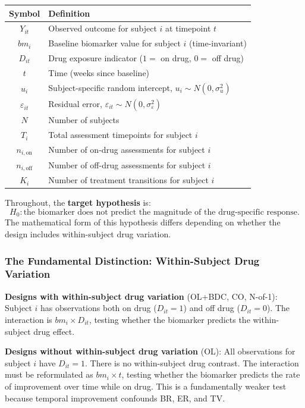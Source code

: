 \documentclass[11pt]{article}
\begin{document}
\begin{table}[h]
\centering\small
\begin{tabular}{@{}cl@{}}
\toprule
Symbol & Definition \\
\midrule
$Y_{it}$ & Observed outcome for subject $i$ at timepoint $t$ \\
$bm_i$ & Baseline biomarker value for subject $i$ (time-invariant) \\
$D_{it}$ & Drug exposure indicator ($1 = $ on drug, $0 = $ off drug) \\
$t$ & Time (weeks since baseline) \\
$u_i$ & Subject-specific random intercept, $u_i \sim N(0, \sigma^2_u)$ \\
$\varepsilon_{it}$ & Residual error, $\varepsilon_{it} \sim N(0, \sigma^2_\varepsilon)$ \\
$N$ & Number of subjects \\
$T_i$ & Total assessment timepoints for subject $i$ \\
$n_{i,\text{on}}$ & Number of on-drug assessments for subject $i$ \\
$n_{i,\text{off}}$ & Number of off-drug assessments for subject $i$ \\
$K_i$ & Number of treatment transitions for subject $i$ \\
\bottomrule
\end{tabular}
\end{table}

Throughout, the \textbf{target hypothesis} is:
\[
H_0: \text{the biomarker does not predict the magnitude of the
drug-specific response.}
\]
The mathematical form of this hypothesis differs depending on whether
the design includes within-subject drug variation.

\subsubsection{The Fundamental Distinction: Within-Subject Drug Variation}

\textbf{Designs with within-subject drug variation} (OL+BDC, CO,
N-of-1): Subject $i$ has observations both on drug ($D_{it} = 1$) and
off drug ($D_{it} = 0$). The interaction is $bm_i \times D_{it}$,
testing whether the biomarker predicts the within-subject drug effect.

\textbf{Designs without within-subject drug variation} (OL): All
observations for subject $i$ have $D_{it} = 1$. There is no
within-subject drug contrast. The interaction must be reformulated as
$bm_i \times t$, testing whether the biomarker predicts the rate of
improvement over time while on drug. This is a fundamentally weaker test
because temporal improvement confounds BR, ER, and TV.
\end{document}
